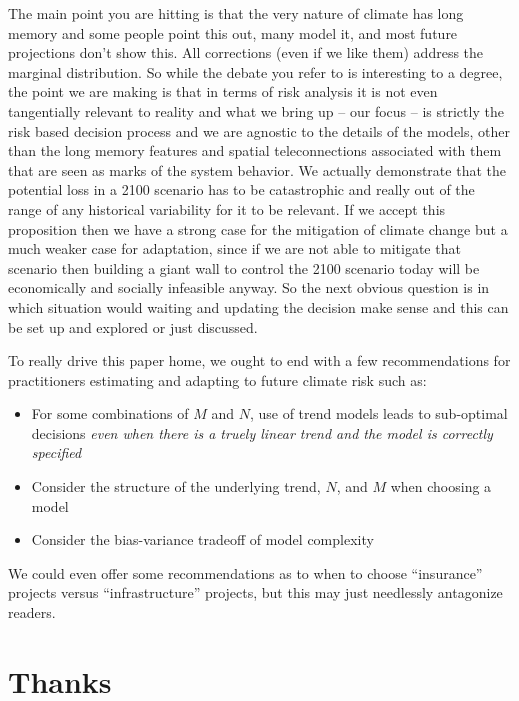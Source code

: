 \documentclass[12pt]{article}
\begin{document}
The main point you are hitting is that the very nature of climate has long memory and some people point this out, many model it, and most future projections don't show this.
All corrections (even if we like them) address the marginal distribution.
So while the debate you refer to is interesting to a degree, the point we are making is that in terms of risk analysis it is not even tangentially relevant to reality and what we bring up -- our focus -- is strictly the risk based decision process and we are agnostic to the details of the models, other than the long memory features and spatial teleconnections associated with them that are seen as marks of the system behavior.
We actually demonstrate that the potential loss in a 2100 scenario has to be catastrophic and really out of the range of any historical variability for it to be relevant.
If we accept this proposition then we have a strong case for the mitigation of climate change but a much weaker case for adaptation, since if we are not able to mitigate that scenario then building a giant wall to control the 2100 scenario today will be economically and socially infeasible anyway.
So the next obvious question is in which situation would waiting and updating the decision make sense and this can be set up and explored or just discussed.

To really drive this paper home, we ought to end with a few recommendations for practitioners estimating and adapting to future climate risk such as:
\begin{itemize}
  \item For some combinations of $M$ and $N$, use of trend models leads to sub-optimal decisions \emph{even when there is a truely linear trend and the model is correctly specified}
  \item Consider the structure of the underlying trend, $N$, and $M$ when choosing a model
  \item Consider the bias-variance tradeoff of model complexity
\end{itemize}
We could even offer some recommendations as to when to choose ``insurance'' projects versus ``infrastructure'' projects, but this may just needlessly antagonize readers.


\appendix

\section{Thanks}
\end{document}
